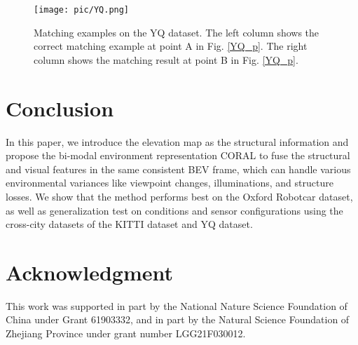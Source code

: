 \documentclass[letterpaper, 10 pt, conference]{ieeeconf}  \usepackage{tabularx}
\begin{document}
\begin{figure}[tp]
    \vspace{2.6mm}
	\centering
	\texttt{[image: pic/YQ.png]}
	
	\caption{Matching examples on the YQ dataset. The left column shows the correct matching example at point A in Fig. \ref{YQ_p}. The right column shows the matching result at point B in Fig. \ref{YQ_p}.}
	\label{YQ}
	\vspace{-10pt}
\end{figure}

\section{Conclusion}

In this paper, we introduce the elevation map as the structural information and propose the bi-modal environment representation CORAL to fuse the structural and visual features in the same consistent BEV frame, which can handle various environmental variances like viewpoint changes, illuminations, and structure losses. We show that the method performs best on the Oxford Robotcar dataset, as well as generalization test on conditions and sensor configurations using the cross-city datasets of the KITTI dataset and YQ dataset.

\section{Acknowledgment}

This work was supported in part by the National Nature Science Foundation of China under Grant 61903332, and in part by the Natural Science Foundation of Zhejiang Province under grant number LGG21F030012.


\printbibliography
\end{document}
